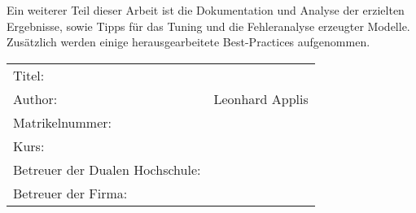 Ein weiterer Teil dieser Arbeit ist die Dokumentation und Analyse der erzielten Ergebnisse, sowie Tipps für das Tuning und die Fehleranalyse erzeugter Modelle. Zusätzlich werden einige herausgearbeitete Best-Practices aufgenommen.
~\newline
~\newline
\begin{flushleft}
	\begin{tabular}{ll}
		Titel:& \quad \titel \\ 
		Author:& \quad Leonhard Applis \\
		Matrikelnummer: & \quad \matrikelnr  \\
		Kurs: & \quad \kurs \\ 
		Betreuer der Dualen Hochschule: & \quad \betreuerdhbw \\ 
		Betreuer der Firma: & \quad \betreuerfirma \\
		[6ex]%
	\end{tabular} 
\end{flushleft}